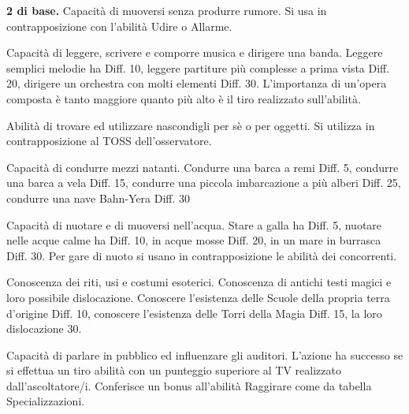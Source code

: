  \textbf{2 di base.} Capacit\`a di
muoversi senza produrre rumore.  Si usa in contrapposizione con
l'abilit\`a Udire o Allarme.

\iffullversion
{} Capacit\`a di leggere, scrivere e comporre musica e
dirigere una banda.  Leggere semplici melodie ha Diff. 10, leggere
partiture pi\`u complesse a prima vista Diff.  20, dirigere un
orchestra con molti elementi Diff. 30. L'importanza di un'opera
composta \`e tanto maggiore quanto pi\`u alto \`e il tiro realizzato
sull'abilit\`a.

\fi

 Abilit\`a di
trovare ed utilizzare nascondigli per s\`e o per oggetti. Si
utilizza in contrapposizione al TOSS dell'osservatore.

 Capacit\`a di condurre mezzi natanti.
Condurre una barca a remi Diff. 5, condurre una barca a vela Diff. 15,
condurre una piccola imbarcazione a pi\`u alberi Diff. 25, condurre
una nave Bahn-Yera Diff. 30

 Capacit\`a di nuotare e di muoversi
nell'acqua. Stare a galla ha Diff. 5, nuotare nelle acque calme ha
Diff. 10, in acque mosse Diff. 20, in un mare in burrasca Diff. 30.
Per gare di nuoto si usano in contrapposizione le abilit\`a dei
concorrenti.

\iffullversion
{}  Conoscenza dei riti, usi e
costumi esoterici. Conoscenza di antichi testi magici e loro possibile
dislocazione. Conoscere l'esistenza delle Scuole della propria terra
d'origine Diff. 10, conoscere l'esistenza delle Torri della Magia
Diff. 15, la loro dislocazione 30.

 Capacit\`a di parlare in pubblico ed
influenzare gli auditori. L'azione ha successo se si effettua un tiro
abilit\`a con un punteggio superiore al TV realizzato dall'ascoltatore/i.
Conferisce un bonus all'abilit\`a Raggirare come da tabella
Specializzazioni.


